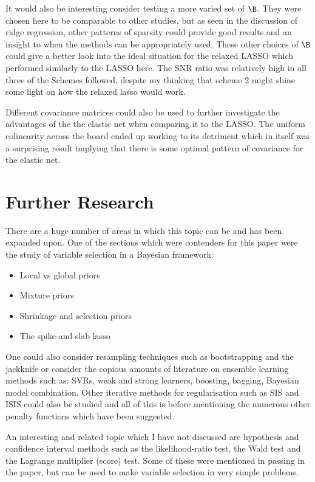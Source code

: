 It would also be interesting consider testing a more varied set of $\B$. They were chosen here to be comparable to other studies, but as seen in the discussion of ridge regression, other patterns of sparsity could provide good results and an insight to when the methods can be appropriately used. These other choices of $\B$ could give a better look into the ideal situation for the relaxed LASSO which performed similarly to the LASSO here. The SNR ratio was relatively high in all three of the Schemes followed, despite my thinking that scheme 2 might shine some light on how the relaxed lasso would work.

Different covariance matrices could also be used to further investigate the advantages of the the elastic net when comparing it to the LASSO. The uniform colinearity across the board ended up working to its detriment which in itself was a surprising result implying that there is some optimal pattern of covariance for the elastic net.

\section{Further Research}

There are a huge number of areas in which this topic can be and has been expanded upon. One of the sections which were contenders for this paper were the study of variable selection in a Bayesian framework:
\begin{itemize}
    \item Local vs global priors
    \item Mixture priors
    \item Shrinkage and selection priors
    \item The spike-and-slab lasso
\end{itemize}

One could also consider resampling techniques such as bootstrapping and the jackknife or consider the copious amounts of literature on ensemble learning methods such as: SVRs, weak and strong learners, boosting, bagging, Bayesian model combination. Other iterative methods for regularisation such as SIS and ISIS could also be studied and all of this is before mentioning the numerous other penalty functions which have been suggested.

An interesting and related topic which I have not discussed are hypothesis and confidence interval methods such as the likelihood-ratio test, the Wald test and the Lagrange multiplier (score) test. Some of these were mentioned in passing in the paper, but can be used to make variable selection in very simple problems.

